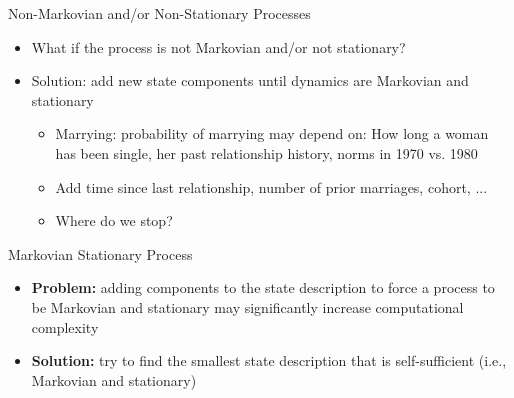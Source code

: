 \documentclass[11pt,table]{beamer}
\begin{document}
\begin{frame}{Non-Markovian and/or Non-Stationary Processes}

\begin{itemize}
    \item  What if the process is not Markovian and/or not  stationary?
\item Solution: add new state components until dynamics  are Markovian and stationary\pause
\begin{itemize}
\item Marrying: probability of marrying may depend on: How long a woman has been single, her past relationship history, norms in 1970 vs. 1980
\item Add time since last relationship, number of prior marriages, cohort, ...\pause
 \item Where do we stop?
 
\end{itemize}

 
 
\end{itemize}
    
\end{frame}

\begin{frame}{Markovian Stationary Process}
\vspace{-28mm}
    \begin{itemize}
        \item  \textbf{Problem:} adding components to the state  description to force a process to be Markovian and  stationary may significantly increase computational  complexity

\item \textbf{Solution:} try to find the smallest state description  that is self-sufficient (i.e., Markovian and stationary)

    \end{itemize}
\end{frame}
\end{document}
